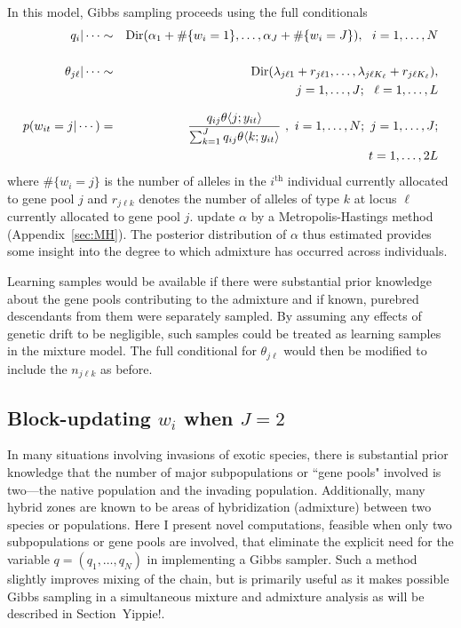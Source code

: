 \documentclass[11pt]{article}
\newcommand{\Dir}{\mathrm{Dir}}
\newcommand{\thh}{^\mathrm{th}}
\newcommand{\thetaof}[2]{\theta \langle #1;#2\rangle}
\begin{document}
In this model, Gibbs sampling
proceeds  using the full conditionals
\begin{eqnarray}
q_i|\cdots  &\sim&  \Dir(\alpha_1 + \#\{w_i=1\},\ldots,\alpha_J +
\#\{w_i=J\} ),~~i=1,\ldots,N
\nonumber   \\ 
\rule{0pt}{5ex}
\theta_{j\ell}|\cdots &\sim &\Dir(\lambda_{j\ell 1} + r_{j\ell 1},
\ldots, \lambda_{j\ell K_\ell} + r_{j\ell K_\ell}), 
 \nonumber \\
& & j = 1,\ldots, J;~~\ell = 1,\ldots, L \nonumber \\
\rule{0pt}{5ex}
p(w_{it}=j|\cdots) &=& \frac{q_{ij} \thetaof{j}{y_{it}}}
{\sum_{k=1}^J q_{ij} \thetaof{k}{y_{it}}}~,~
i=1,\ldots,N;~j=1,\ldots,J; \nonumber  \\
& & t = 1,\ldots,2L \nonumber
\end{eqnarray}
where $\#\{w_i=j\}$ is the number of alleles in the $i\thh$ individual
currently allocated to gene pool $j$ and $r_{j\ell k}$ denotes the number
of alleles of type $k$ at locus $\ell$
currently allocated to gene pool
$j$. 
 update $\alpha$ 
by a Metropolis-Hastings method (Appendix~\ref{sec:MH}). The posterior
distribution of
$\alpha$ thus estimated provides some insight into the degree to which
admixture has occurred across individuals.  


Learning samples would be available if
there were substantial prior knowledge about the gene pools contributing
to the admixture and if known, purebred descendants from them
were separately sampled.   By assuming any
effects of genetic drift to be negligible, such samples could be treated
as learning samples in the mixture model.  The full conditional for
$\theta_{j\ell}$ would then be modified to include the $n_{j\ell k}$ as
before.  

\subsection{Block-updating $w_i$ when $J=2$}
\label{sec:Polya}
In many situations involving invasions of exotic species, there is
substantial prior knowledge that the number of major subpopulations or
``gene pools" involved is two---the native population and the invading
population.  Additionally, many hybrid zones are known to be areas of
hybridization (admixture) between two species or populations.  Here I
present novel computations, feasible when only two subpopulations or gene
pools are involved, that eliminate the explicit need for the variable
$q=(q_1,\ldots,q_N)$ in implementing a Gibbs sampler.   Such a method
slightly improves mixing of the chain, but is primarily useful as it
makes possible Gibbs sampling in a simultaneous mixture and admixture
analysis as will be described in Section~Yippie!.
\end{document}
